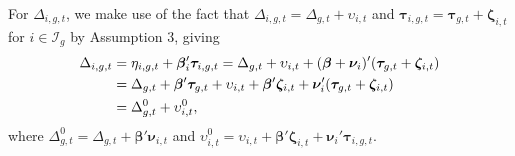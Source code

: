 \documentclass[12pt,fleqn]{article}
\def\+#1{\boldsymbol{#1}}
\begin{document}
For $\Delta_{i,g,t}$, we make use of the fact that $\Delta_{i,g,t}= \Delta_{g,t} + \upsilon_{i,t}$ and $\+\tau_{i,g,t} = \+\tau_{g,t} + \+\zeta_{i,t}$ for $i\in \mathcal{I}_g$ by Assumption 3, giving
\begin{align}
\Delta_{i,g,t} & = \eta_{i,g,t} + \+\beta_i'\+\tau_{i,g,t} = \Delta_{g,t} + \upsilon_{i,t} + (\+\beta + \+\nu_i)'(\+\tau_{g,t} + \+\zeta_{i,t}) \notag\\
& = \Delta_{g,t}  + \+\beta'\+\tau_{g,t} + \upsilon_{i,t}  + \+\beta'\+\zeta_{i,t} + \+\nu_i'(\+\tau_{g,t} + \+\zeta_{i,t})\notag\\
& = \Delta_{g,t}^0 + \upsilon_{i,t}^0,
\end{align}
where $\Delta_{g,t}^0 = \Delta_{g,t} + \+\beta'\+\nu_{i,t}$ and $\upsilon_{i,t}^0 = \upsilon_{i,t}  + \+\beta'\+\zeta_{i,t} + \+\nu_i'\+\tau_{i,g,t}$.
\end{document}
